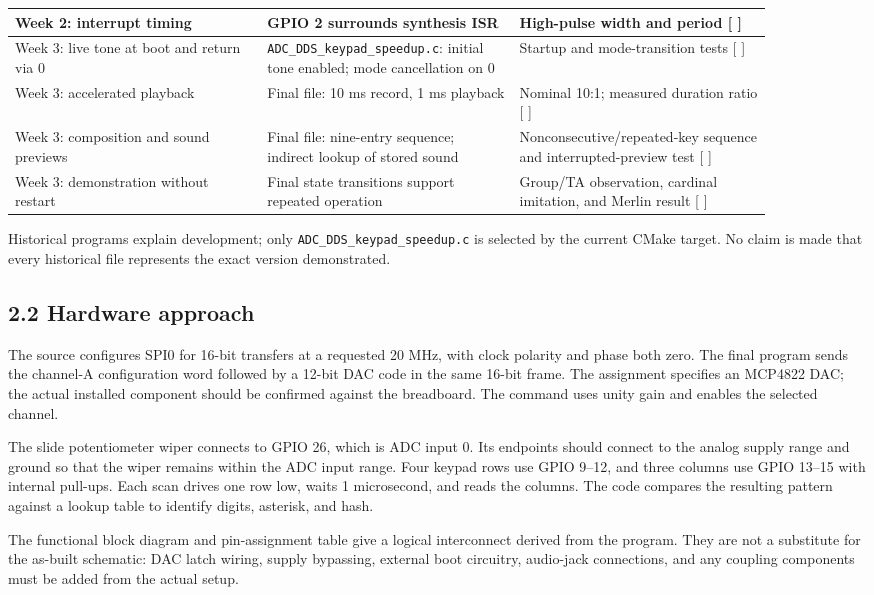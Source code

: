 \documentclass[11pt,letterpaper]{article}
\begin{document}
\begin{longtable}{|>{\raggedright\arraybackslash}p{0.295\linewidth}|>{\raggedright\arraybackslash}p{0.295\linewidth}|>{\raggedright\arraybackslash}p{0.295\linewidth}|}
Week 2: interrupt timing & GPIO 2 surrounds synthesis ISR & High-pulse width and period [ ] \\ \hline
Week 3: live tone at boot and return via 0 & \texttt{ADC\_DDS\_keypad\_speedup.c}: initial tone enabled; mode cancellation on 0 & Startup and mode-transition tests [ ] \\ \hline
Week 3: accelerated playback & Final file: 10 ms record, 1 ms playback & Nominal 10:1; measured duration ratio [ ] \\ \hline
Week 3: composition and sound previews & Final file: nine-entry sequence; indirect lookup of stored sound & Nonconsecutive/repeated-key sequence and interrupted-preview test [ ] \\ \hline
Week 3: demonstration without restart & Final state transitions support repeated operation & Group/TA observation, cardinal imitation, and Merlin result [ ] \\ \hline
\end{longtable}
\endgroup

Historical programs explain development; only \texttt{ADC\_DDS\_keypad\_speedup.c} is selected by the current CMake target. No claim is made that every historical file represents the exact version demonstrated.

\subsection*{2.2 Hardware approach}

The source configures SPI0 for 16-bit transfers at a requested 20 MHz, with clock polarity and phase both zero. The final program sends the channel-A configuration word followed by a 12-bit DAC code in the same 16-bit frame. The assignment specifies an MCP4822 DAC; the actual installed component should be confirmed against the breadboard. The command uses unity gain and enables the selected channel.

The slide potentiometer wiper connects to GPIO 26, which is ADC input 0. Its endpoints should connect to the analog supply range and ground so that the wiper remains within the ADC input range. Four keypad rows use GPIO 9--12, and three columns use GPIO 13--15 with internal pull-ups. Each scan drives one row low, waits 1 microsecond, and reads the columns. The code compares the resulting pattern against a lookup table to identify digits, asterisk, and hash.

The functional block diagram and pin-assignment table give a logical interconnect derived from the program. They are not a substitute for the as-built schematic: DAC latch wiring, supply bypassing, external boot circuitry, audio-jack connections, and any coupling components must be added from the actual setup.
\end{document}

